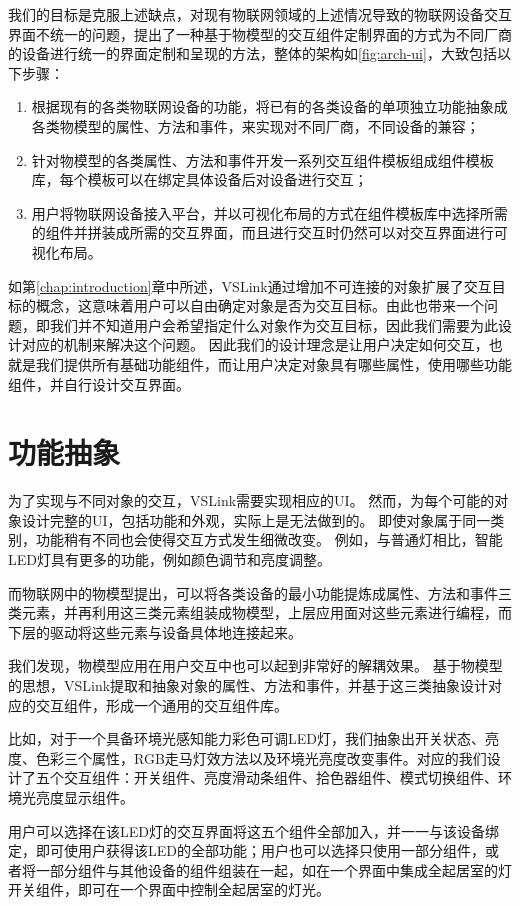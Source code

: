 我们的目标是克服上述缺点，对现有物联网领域的上述情况导致的物联网设备交互界面不统一的问题，提出了一种基于物模型的交互组件定制界面的方式为不同厂商的设备进行统一的界面定制和呈现的方法，整体的架构如\autoref{fig:arch-ui}，大致包括以下步骤：

\begin{enumerate}
	\item 根据现有的各类物联网设备的功能，将已有的各类设备的单项独立功能抽象成各类物模型的属性、方法和事件，来实现对不同厂商，不同设备的兼容；
	\item 针对物模型的各类属性、方法和事件开发一系列交互组件模板组成组件模板库，每个模板可以在绑定具体设备后对设备进行交互；
	\item 用户将物联网设备接入平台，并以可视化布局的方式在组件模板库中选择所需的组件并拼装成所需的交互界面，而且进行交互时仍然可以对交互界面进行可视化布局。
\end{enumerate}

如第\ref{chap:introduction}章中所述，VSLink通过增加不可连接的对象扩展了交互目标的概念，这意味着用户可以自由确定对象是否为交互目标。由此也带来一个问题，即我们并不知道用户会希望指定什么对象作为交互目标，因此我们需要为此设计对应的机制来解决这个问题。
因此我们的设计理念是让用户决定如何交互，也就是我们提供所有基础功能组件，而让用户决定对象具有哪些属性，使用哪些功能组件，并自行设计交互界面。

\section{功能抽象}
为了实现与不同对象的交互，VSLink需要实现相应的UI。
然而，为每个可能的对象设计完整的UI，包括功能和外观，实际上是无法做到的。
即使对象属于同一类别，功能稍有不同也会使得交互方式发生细微改变。
例如，与普通灯相比，智能LED灯具有更多的功能，例如颜色调节和亮度调整。

而物联网中的物模型提出，可以将各类设备的最小功能提炼成属性、方法和事件三类元素，并再利用这三类元素组装成物模型，上层应用面对这些元素进行编程，而下层的驱动将这些元素与设备具体地连接起来。

我们发现，物模型应用在用户交互中也可以起到非常好的解耦效果。
基于物模型的思想，VSLink提取和抽象对象的属性、方法和事件，并基于这三类抽象设计对应的交互组件，形成一个通用的交互组件库。

比如，对于一个具备环境光感知能力彩色可调LED灯，我们抽象出开关状态、亮度、色彩三个属性，RGB走马灯效方法以及环境光亮度改变事件。对应的我们设计了五个交互组件：开关组件、亮度滑动条组件、拾色器组件、模式切换组件、环境光亮度显示组件。

用户可以选择在该LED灯的交互界面将这五个组件全部加入，并一一与该设备绑定，即可使用户获得该LED的全部功能；用户也可以选择只使用一部分组件，或者将一部分组件与其他设备的组件组装在一起，如在一个界面中集成全起居室的灯开关组件，即可在一个界面中控制全起居室的灯光。

